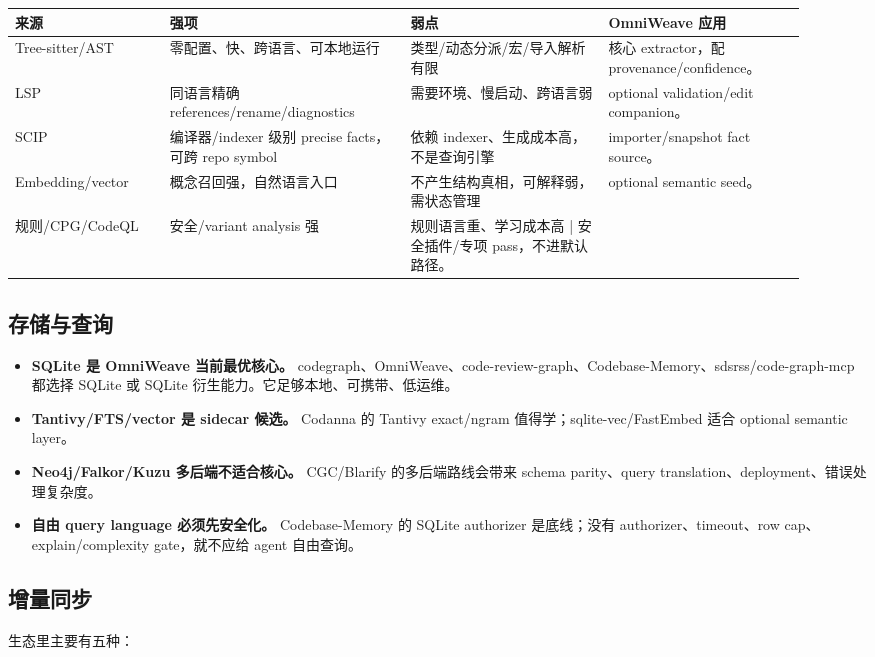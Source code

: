 \documentclass[11pt,a4paper]{article}
\begin{document}
\begin{longtable}{p{0.18\linewidth}p{0.28\linewidth}p{0.23\linewidth}p{0.23\linewidth}}
\toprule
来源 & 强项 & 弱点 & OmniWeave 应用 \\
\midrule
\endhead
Tree-sitter/AST & 零配置、快、跨语言、可本地运行 & 类型/动态分派/宏/导入解析有限 & 核心 extractor，配 provenance/confidence。 \\
LSP & 同语言精确 references/rename/diagnostics & 需要环境、慢启动、跨语言弱 & optional validation/edit companion。 \\
SCIP & 编译器/indexer 级别 precise facts，可跨 repo symbol & 依赖 indexer、生成成本高，不是查询引擎 & importer/snapshot fact source。 \\
Embedding/vector & 概念召回强，自然语言入口 & 不产生结构真相，可解释弱，需状态管理 & optional semantic seed。 \\
规则/CPG/CodeQL & 安全/variant analysis 强 & 规则语言重、学习成本高 | 安全插件/专项 pass，不进默认路径。 \\
\bottomrule
\end{longtable}

\subsection{存储与查询}

\begin{itemize}
  \item \textbf{SQLite 是 OmniWeave 当前最优核心。} codegraph、OmniWeave、code-review-graph、Codebase-Memory、sdsrss/code-graph-mcp 都选择 SQLite 或 SQLite 衍生能力。它足够本地、可携带、低运维。
  \item \textbf{Tantivy/FTS/vector 是 sidecar 候选。} Codanna 的 Tantivy exact/ngram 值得学；sqlite-vec/FastEmbed 适合 optional semantic layer。
  \item \textbf{Neo4j/Falkor/Kuzu 多后端不适合核心。} CGC/Blarify 的多后端路线会带来 schema parity、query translation、deployment、错误处理复杂度。
  \item \textbf{自由 query language 必须先安全化。} Codebase-Memory 的 SQLite authorizer 是底线；没有 authorizer、timeout、row cap、explain/complexity gate，就不应给 agent 自由查询。
\end{itemize}

\subsection{增量同步}

生态里主要有五种：
\end{document}
